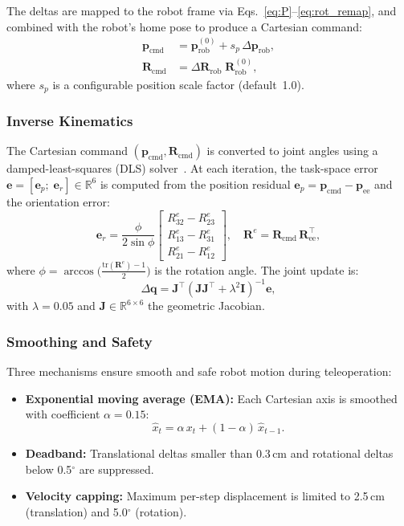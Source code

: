 \documentclass[conference]{IEEEtran}
\begin{document}
The deltas are mapped to the robot frame via Eqs.~\eqref{eq:P}--\eqref{eq:rot_remap}, and combined with the robot's home pose to produce a Cartesian command:
\begin{align}
\mathbf{p}_\mathrm{cmd} &= \mathbf{p}_\mathrm{rob}^{(0)} + s_p\,\Delta\mathbf{p}_\mathrm{rob}, \label{eq:p_cmd}\\
\mathbf{R}_\mathrm{cmd} &= \Delta\mathbf{R}_\mathrm{rob}\;\mathbf{R}_\mathrm{rob}^{(0)}, \label{eq:R_cmd}
\end{align}
where $s_p$ is a configurable position scale factor (default~1.0).

\subsubsection{Inverse Kinematics}
The Cartesian command $(\mathbf{p}_\mathrm{cmd},\mathbf{R}_\mathrm{cmd})$ is converted to joint angles using a damped-least-squares (DLS) solver~\cite{wampler1986manipulator}. At each iteration, the task-space error $\mathbf{e} = [\mathbf{e}_p;\;\mathbf{e}_r] \in \mathbb{R}^6$ is computed from the position residual $\mathbf{e}_p = \mathbf{p}_\mathrm{cmd} - \mathbf{p}_\mathrm{ee}$ and the orientation error:
\begin{equation}
\label{eq:rot_err}
\mathbf{e}_r = \frac{\phi}{2\sin\phi}
\begin{bmatrix}
R_{32}^e - R_{23}^e \\ R_{13}^e - R_{31}^e \\ R_{21}^e - R_{12}^e
\end{bmatrix}, \quad \mathbf{R}^e = \mathbf{R}_\mathrm{cmd}\,\mathbf{R}_\mathrm{ee}^\top,
\end{equation}
where $\phi = \arccos\!\bigl(\tfrac{\mathrm{tr}(\mathbf{R}^e)-1}{2}\bigr)$ is the rotation angle. The joint update is:
\begin{equation}
\label{eq:dls}
\Delta\mathbf{q} = \mathbf{J}^\top\!\left(\mathbf{J}\mathbf{J}^\top + \lambda^2\mathbf{I}\right)^{-1}\mathbf{e},
\end{equation}
with $\lambda = 0.05$ and $\mathbf{J} \in \mathbb{R}^{6\times 6}$ the geometric Jacobian.

\subsubsection{Smoothing and Safety}

Three mechanisms ensure smooth and safe robot motion during teleoperation:
\begin{itemize}
    \item \textbf{Exponential moving average (EMA):} Each Cartesian axis is smoothed with coefficient $\alpha = 0.15$:
    \begin{equation}
    \hat{x}_t = \alpha\, x_t + (1-\alpha)\,\hat{x}_{t-1}.
    \end{equation}
    \item \textbf{Deadband:} Translational deltas smaller than 0.3\,cm and rotational deltas below 0.5$^\circ$ are suppressed.
    \item \textbf{Velocity capping:} Maximum per-step displacement is limited to 2.5\,cm (translation) and 5.0$^\circ$ (rotation).
\end{itemize}
\end{document}
